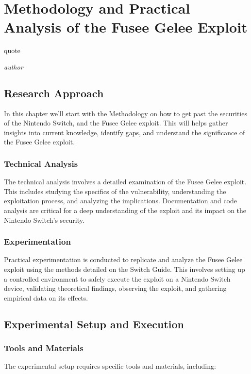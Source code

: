 \chapter{Methodology and Practical Analysis of the Fusee Gelee Exploit}
\epigraph{quote}{\textit{author}}

\section{Research Approach}

In this chapter we'll start with the Methodology on how to get past the securities of the Nintendo Switch, and the Fusee Gelee exploit. This will helps gather insights into current knowledge, identify gaps, and understand the significance of the Fusee Gelee exploit.

\subsection{Technical Analysis}

The technical analysis involves a detailed examination of the Fusee Gelee exploit. This includes studying the specifics of the vulnerability, understanding the exploitation process, and analyzing the implications. Documentation and code analysis are critical for a deep understanding of the exploit and its impact on the Nintendo Switch's security.

\subsection{Experimentation}

Practical experimentation is conducted to replicate and analyze the Fusee Gelee exploit using the methods detailed on the Switch Guide. This involves setting up a controlled environment to safely execute the exploit on a Nintendo Switch device, validating theoretical findings, observing the exploit, and gathering empirical data on its effects.

\section{Experimental Setup and Execution}

\subsection{Tools and Materials}

The experimental setup requires specific tools and materials, including:

